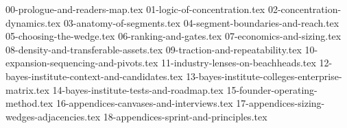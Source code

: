 
{00-prologue-and-readers-map.tex}
{01-logic-of-concentration.tex}
{02-concentration-dynamics.tex}
{03-anatomy-of-segments.tex}
{04-segment-boundaries-and-reach.tex}
{05-choosing-the-wedge.tex}
{06-ranking-and-gates.tex}
{07-economics-and-sizing.tex}
{08-density-and-transferable-assets.tex}
{09-traction-and-repeatability.tex}
{10-expansion-sequencing-and-pivots.tex}
{11-industry-lenses-on-beachheads.tex}
{12-bayes-institute-context-and-candidates.tex}
{13-bayes-institute-colleges-enterprise-matrix.tex}
{14-bayes-institute-tests-and-roadmap.tex}
{15-founder-operating-method.tex}
{16-appendices-canvases-and-interviews.tex}
{17-appendices-sizing-wedges-adjacencies.tex}
{18-appendices-sprint-and-principles.tex}
